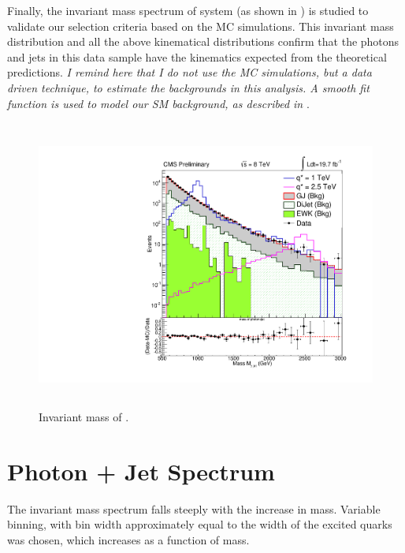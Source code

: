 Finally, the invariant mass spectrum of \gamjet system (as shown in \fig{\ref{fig:massVarBin}}) is studied to validate our selection
criteria based on the MC simulations. This invariant mass distribution and all the above kinematical distributions confirm that the photons 
and jets in this data sample have the kinematics expected from the theoretical predictions. \emph{I remind here that I do not use the MC simulations, 
but a data driven technique, to estimate the backgrounds in this analysis. A smooth fit function is used to model our SM background, as 
described in \sectn{\ref{Se:fit}}}.
\begin{figure}[h!]
\centering
 \includegraphics[width=13.8cm,height=9.5cm]{ch5/plots/DataMC/mass_VarBin.pdf}
 \caption{Invariant mass of \gamjet.}
\label{fig:massVarBin}
\end{figure}

\section{Photon + Jet Spectrum}
The \gamjet invariant mass spectrum falls steeply with the increase in \gamjet mass. Variable binning, with bin width approximately equal to
the width of the excited quarks was chosen, which increases as a function of mass. 

